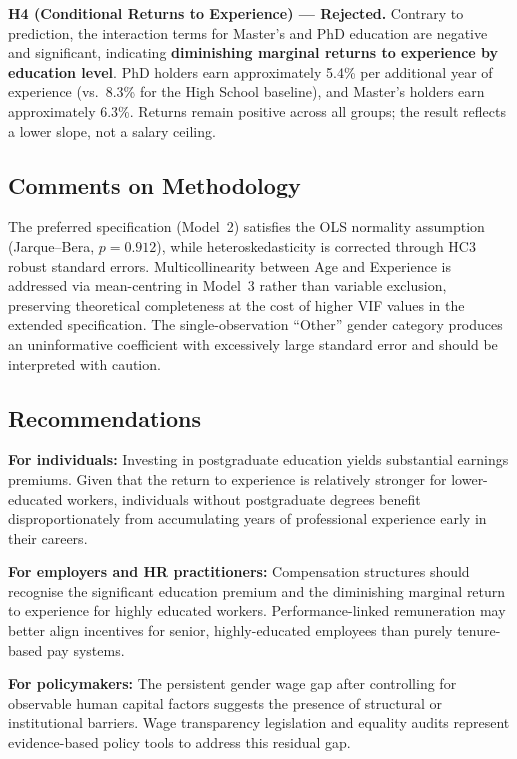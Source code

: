 \documentclass[12pt, a4paper]{article}
\begin{document}
\textbf{H4 (Conditional Returns to Experience) --- Rejected.} Contrary to prediction, the interaction terms for Master's and PhD education are negative and significant, indicating \textbf{diminishing marginal returns to experience by education level}. PhD holders earn approximately 5.4\% per additional year of experience (vs.\ 8.3\% for the High School baseline), and Master's holders earn approximately 6.3\%. Returns remain positive across all groups; the result reflects a lower slope, not a salary ceiling.

\subsection{Comments on Methodology}
The preferred specification (Model~2) satisfies the OLS normality assumption (Jarque--Bera, $p = 0.912$), while heteroskedasticity is corrected through HC3 robust standard errors. Multicollinearity between Age and Experience is addressed via mean-centring in Model~3 rather than variable exclusion, preserving theoretical completeness at the cost of higher VIF values in the extended specification. The single-observation ``Other'' gender category produces an uninformative coefficient with excessively large standard error and should be interpreted with caution.

\subsection{Recommendations}
\textbf{For individuals:} Investing in postgraduate education yields substantial earnings premiums. Given that the return to experience is relatively stronger for lower-educated workers, individuals without postgraduate degrees benefit disproportionately from accumulating years of professional experience early in their careers.

\textbf{For employers and HR practitioners:} Compensation structures should recognise the significant education premium and the diminishing marginal return to experience for highly educated workers. Performance-linked remuneration may better align incentives for senior, highly-educated employees than purely tenure-based pay systems.

\textbf{For policymakers:} The persistent gender wage gap after controlling for observable human capital factors suggests the presence of structural or institutional barriers. Wage transparency legislation and equality audits represent evidence-based policy tools to address this residual gap.
\end{document}
